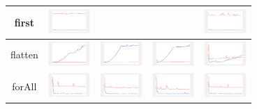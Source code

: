 \begin{longtable}{ c|c c c c}
first
&
\includegraphics[width=1.6cm]{graphs/sequence/small/First}
&
&
&
\includegraphics[width=1.6cm]{graphs/orderedset/small/First}
\\\hline

flatten
&
\includegraphics[width=1.6cm]{graphs/sequence/small/Flatten}
&
\includegraphics[width=1.6cm]{graphs/set/small/Flatten}
&
\includegraphics[width=1.6cm]{graphs/bag/small/Flatten}
&
\includegraphics[width=1.6cm]{graphs/orderedset/small/Flatten}
\\\hline

forAll
&
\includegraphics[width=1.6cm]{graphs/sequence/small/forALL}
&
\includegraphics[width=1.6cm]{graphs/set/small/forALL}
&
\includegraphics[width=1.6cm]{graphs/bag/small/forALL}
&
\includegraphics[width=1.6cm]{graphs/orderedset/small/forALL}
\\\hline


\end{longtable}
